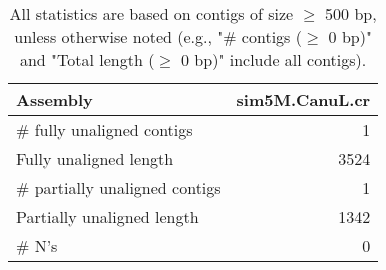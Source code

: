 \documentclass[12pt,a4paper]{article}
\begin{document}
\begin{table}[ht]
\begin{center}
\caption{All statistics are based on contigs of size $\geq$ 500 bp, unless otherwise noted (e.g., "\# contigs ($\geq$ 0 bp)" and "Total length ($\geq$ 0 bp)" include all contigs).}
\begin{tabular}{|l*{1}{|r}|}
\hline
Assembly & sim5M.CanuL.cr \\ \hline
\# fully unaligned contigs & 1 \\ \hline
Fully unaligned length & 3524 \\ \hline
\# partially unaligned contigs & 1 \\ \hline
Partially unaligned length & 1342 \\ \hline
\# N's & 0 \\ \hline
\end{tabular}
\end{center}
\end{table}
\end{document}
